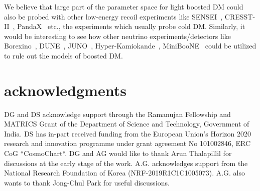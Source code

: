 \documentclass[11pt,prd,twocolumn,nofootinbib,reprint,superscriptaddress,longbibliography,colorlinks=true,citecolor=blue]{revtex4-1}
\begin{document}
We believe that large part of the parameter space for light boosted DM could also be probed with other low-energy recoil experiments like SENSEI~\cite{SENSEI:2020dpa}, CRESST-II~\cite{CRESST:2015txj}, PandaX~\cite{PandaX-II:2021nsg} etc., the experiments which usually probe cold DM. Similarly, it would be interesting to see how other neutrino experiments/detectors like  Borexino~\cite{Bellini:2011rx}, DUNE~\cite{DUNE:2015lol}, JUNO~\cite{JUNO:2015zny}, Hyper-Kamiokande~\cite{Hyper-Kamiokande:2016srs}, MiniBooNE~\cite{MiniBooNEDM:2018cxm} could be utilized to rule out the models of boosted DM. 

\section*{acknowledgments}
DG and DS acknowledge support through the Ramanujan Fellowship and MATRICS Grant of the Department of Science and Technology, Government of India.  DS has in-part received funding from the European Union’s Horizon 2020 research and innovation programme under grant agreement No 101002846, ERC
CoG “CosmoChart``. DG and AG would like to thank Arun Thalapillil for discussions at the early stage of the work. A.G. acknowledges support from the National Research Foundation of Korea (NRF-2019R1C1C1005073). A.G. also wants to thank Jong-Chul Park for useful discussions.

%


\end{document}

